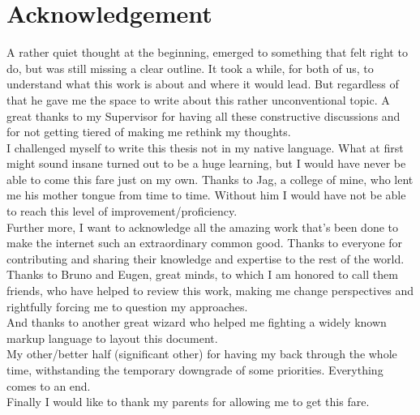 \documentclass[12pt,english,a4paper,titlepage,cleardoublepage=empty,dottedtoc]{report}
\begin{document}
\section*{Acknowledgement}
A rather quiet thought at the beginning, emerged to something that felt
right to do, but was still missing a clear outline. It took a while, for
both of us, to understand what this work is about and where it would
lead. But regardless of that he gave me the space to write about this
rather unconventional topic. A great thanks to my Supervisor for having
all these constructive discussions and for not getting tiered of making
me rethink my thoughts.\\[2\baselineskip]I challenged myself to write
this thesis not in my native language. What at first might sound insane
turned out to be a huge learning, but I would have never be able to come
this fare just on my own. Thanks to Jag, a college of mine, who lent me
his mother tongue from time to time. Without him I would have not be
able to reach this level of
improvement/proficiency.\\[2\baselineskip]Further more, I want to
acknowledge all the amazing work that's been done to make the internet
such an extraordinary common good. Thanks to everyone for contributing
and sharing their knowledge and expertise to the rest of the
world.\\[2\baselineskip]Thanks to Bruno and Eugen, great minds, to which
I am honored to call them friends, who have helped to review this work,
making me change perspectives and rightfully forcing me to question my
approaches.\\
And thanks to another great wizard who helped me fighting a widely known
markup language to layout this document.\\
My other/better half (significant other) for having my back through the
whole time, withstanding the temporary downgrade of some priorities.
Everything comes to an end.\\
Finally I would like to thank my parents for allowing me to get this
fare.
\newpage


{
\setcounter{tocdepth}{1}
\pagestyle{plain}
\tableofcontents
}
\newpage
{}
\listoftables
\newpage
{}
\listoffigures
\newpage
\newpage
\end{document}

